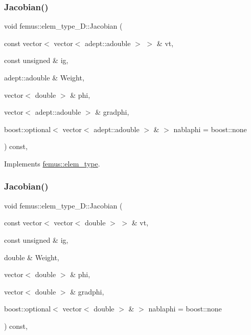 \mbox{\label{classfemus_1_1elem__type__3_d_a6ba1c6d58757d317c455e9041bdb1970}} 
\subsubsection{\texorpdfstring{Jacobian()}{Jacobian()}\hspace{0.1cm}{\footnotesize\ttfamily [1/4]}}
{\footnotesize\ttfamily void femus\+::elem\+\_\+type\+\_\+D\+::\+Jacobian (\begin{DoxyParamCaption}\item[{const vector$<$ vector$<$ adept\+::adouble $>$ $>$ \&}]{vt,  }\item[{const unsigned \&}]{ig,  }\item[{adept\+::adouble \&}]{Weight,  }\item[{vector$<$ double $>$ \&}]{phi,  }\item[{vector$<$ adept\+::adouble $>$ \&}]{gradphi,  }\item[{boost\+::optional$<$ vector$<$ adept\+::adouble $>$ \& $>$}]{nablaphi = {\ttfamily boost\+:\+:none} }\end{DoxyParamCaption}) const\hspace{0.3cm}{\ttfamily [inline]}, {\ttfamily [virtual]}}



Implements \mbox{\hyperlink{classfemus_1_1elem__type_a937b1d5ecbeed3b17db831264a3492fa}{femus\+::elem\+\_\+type}}.

\mbox{\label{classfemus_1_1elem__type__3_d_a83c519de8adf50f547627123db1a82ee}} 
\subsubsection{\texorpdfstring{Jacobian()}{Jacobian()}\hspace{0.1cm}{\footnotesize\ttfamily [2/4]}}
{\footnotesize\ttfamily void femus\+::elem\+\_\+type\+\_\+D\+::\+Jacobian (\begin{DoxyParamCaption}\item[{const vector$<$ vector$<$ double $>$ $>$ \&}]{vt,  }\item[{const unsigned \&}]{ig,  }\item[{double \&}]{Weight,  }\item[{vector$<$ double $>$ \&}]{phi,  }\item[{vector$<$ double $>$ \&}]{gradphi,  }\item[{boost\+::optional$<$ vector$<$ double $>$ \& $>$}]{nablaphi = {\ttfamily boost\+:\+:none} }\end{DoxyParamCaption}) const\hspace{0.3cm}{\ttfamily [inline]}, {\ttfamily [virtual]}}



